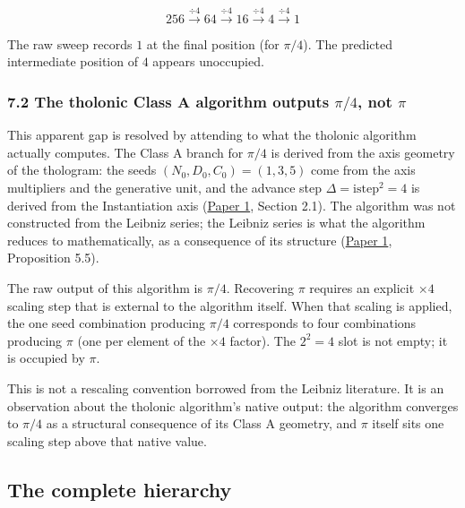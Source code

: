 \documentclass[12pt]{article}
\begin{document}
\[
256 \xrightarrow{\div 4} 64 \xrightarrow{\div 4} 16 \xrightarrow{\div 4} 4 \xrightarrow{\div 4} 1
\]

The raw sweep records \(1\) at the final position (for \(\pi/4\)). The
predicted intermediate position of \(4\) appears unoccupied.

\subsubsection{\texorpdfstring{7.2 The tholonic Class A algorithm
outputs \(\pi/4\), not
\(\pi\)}{7.2 The tholonic Class A algorithm outputs \textbackslash pi/4, not \textbackslash pi}}\label{the-tholonic-class-a-algorithm-outputs-pi4-not-pi}

This apparent gap is resolved by attending to what the tholonic
algorithm actually computes. The Class A branch for \(\pi/4\) is derived
from the axis geometry of the thologram: the seeds
\((N_0, D_0, C_0) = (1, 3, 5)\) come from the axis multipliers and the
generative unit, and the advance step \(\Delta = \mathrm{istep}^2 = 4\)
is derived from the Instantiation axis
(\href{https://github.com/baardev/truevalue/blob/main/docnav/Research/papers/1_recursive-tholonic-five-constants/1_recursive-tholonic-five-constants.pdf}{Paper
1}, Section 2.1). The algorithm was not constructed from the Leibniz
series; the Leibniz series is what the algorithm reduces to
mathematically, as a consequence of its structure
(\href{https://github.com/baardev/truevalue/blob/main/docnav/Research/papers/1_recursive-tholonic-five-constants/1_recursive-tholonic-five-constants.pdf}{Paper
1}, Proposition 5.5).

The raw output of this algorithm is \(\pi/4\). Recovering \(\pi\)
requires an explicit \(\times 4\) scaling step that is external to the
algorithm itself. When that scaling is applied, the one seed combination
producing \(\pi/4\) corresponds to four combinations producing \(\pi\)
(one per element of the \(\times 4\) factor). The \(2^2 = 4\) slot is
not empty; it is occupied by \(\pi\).

This is not a rescaling convention borrowed from the Leibniz literature.
It is an observation about the tholonic algorithm's native output: the
algorithm converges to \(\pi/4\) as a structural consequence of its
Class A geometry, and \(\pi\) itself sits one scaling step above that
native value.

\subsection{The complete hierarchy}\label{the-complete-hierarchy}
\end{document}
